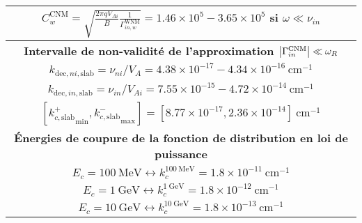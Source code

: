 \documentclass[10pt,a4paper]{article}
\begin{document}
\begin{center}
\begin{tabular}{|c|}
$C^\mathrm{CNM}_w = \sqrt{\frac{2\pi qV_{Ai}}{B} \frac{1}{\Gamma^\mathrm{WNM}_{in,w}}} = 1.46\times 10^5 - 3.65 \times 10^5$ si $\omega \ll \nu_{in}$ \\ 
\hline 
\hline
\bf{Intervalle de non-validité de l'approximation $\abs{\Gamma^\mathrm{CNM}_{in}} \ll \omega_R$} \\ 
\hline
$k_{\mathrm{dec},ni,\mathrm{slab}} = \nu_{ni}/V_A = 4.38\times 10^{-17} - 4.34 \times 10^{-16} ~ \mathrm{cm}^{-1}$ \\ 
$k_{\mathrm{dec},in,\mathrm{slab}} = \nu_{in}/V_{Ai} = 7.55\times 10^{-15} - 4.72 \times 10^{-14} ~ \mathrm{cm}^{-1}$ \\ 
$\left[{k^+_{c,\mathrm{slab}}}_\mathrm{min}, {k^-_{c,\mathrm{slab}}}_\mathrm{max} \right] = [8.77 \times 10^{-17}, 2.36\times 10^{-14}] ~ \mathrm{cm}^{-1}$ \\ 
\hline
\hline
\bf{Énergies de coupure de la fonction de distribution en loi de puissance} \\ 
\hline
$E_c = 100~\mathrm{MeV} \leftrightarrow k^{100~\mathrm{MeV}}_c = 1.8\times 10^{-11}~\mathrm{cm}^{-1}$ \\ 
$E_c = 1~\mathrm{GeV} \leftrightarrow k^{1~\mathrm{GeV}}_c = 1.8\times 10^{-12}~\mathrm{cm}^{-1}$     \\ 
$E_c = 10~\mathrm{GeV} \leftrightarrow k^{10~\mathrm{GeV}}_c = 1.8\times 10^{-13}~\mathrm{cm}^{-1}$   \\ 
\hline

\end{tabular}
\label{param_CNM}




\end{center}
\end{document}
